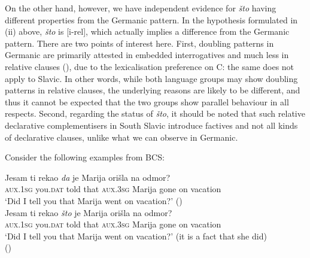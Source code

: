 \documentclass[output=paper]{langscibook}
\begin{document}
On the other hand, however, we have independent evidence for \textit{što} having different properties from the Germanic pattern. In the hypothesis formulated in (ii) above, \textit{što} is [i-rel], which actually implies a difference from the Germanic pattern. There are two points of interest here. First, doubling patterns in Germanic are primarily attested in embedded interrogatives and much less in relative clauses (\citealt{bacskaiatkari2022jb}), due to the lexicalisation preference on C: the same does not apply to Slavic. In other words, while both language groups may show doubling patterns in relative clauses, the underlying reasons are likely to be different, and thus it cannot be expected that the two groups show parallel behaviour in all respects. Second, regarding the status of \textit{što}, it should be noted that such relative declarative complementisers in South Slavic introduce factives and not all kinds of declarative clauses, unlike what we can observe in Germanic.

Consider the following examples from BCS:

\ea
\ea \gll Jesam ti rekao \textit{da} je Marija ori\v{s}la na odmor? \label{bacsk:ex:nonfact}\\
\textsc{aux.1sg} you.\textsc{dat} told that \textsc{aux.3sg} Marija gone on vacation\\
\glt `Did I tell you that Marija went on vacation?' \hfill (\citealt[341]{arsenijevic2020})\\
\ex \gll Jesam ti rekao \textit{\v{s}to} je Marija ori\v{s}la na odmor? \label{bacsk:ex:factive}\\
\textsc{aux.1sg} you.\textsc{dat} told that \textsc{aux.3sg} Marija gone on vacation\\
\glt `Did I tell you that Marija went on vacation?' (it is a fact that she did)\\\hfill (\citealt[341]{arsenijevic2020})
\z
\z
\end{document}
